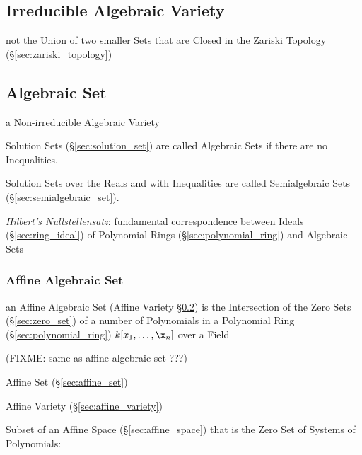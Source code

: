 \subsection{Irreducible Algebraic Variety}
\label{sec:irreducible_algebraic_variety}

not the Union of two smaller Sets that are Closed in the Zariski Topology
(\S\ref{sec:zariski_topology})



\subsection{Algebraic Set}\label{sec:algebraic_set}

a Non-irreducible Algebraic Variety

Solution Sets (\S\ref{sec:solution_set}) are called Algebraic Sets if there are
no Inequalities.

Solution Sets over the Reals and with Inequalities are called Semialgebraic
Sets (\S\ref{sec:semialgebraic_set}).

\emph{Hilbert's Nullstellensatz}: fundamental correspondence between Ideals
(\S\ref{sec:ring_ideal}) of Polynomial Rings (\S\ref{sec:polynomial_ring}) and
Algebraic Sets



\subsubsection{Affine Algebraic Set}\label{sec:affine_algebraic_set}

an Affine Algebraic Set (Affine Variety \S\ref{sec:algebraic_set}) is the
Intersection of the Zero Sets (\S\ref{sec:zero_set}) of a number of Polynomials
in a Polynomial Ring (\S\ref{sec:polynomial_ring}) $k[x_1,\ldots,\x_n]$ over a
Field

(FIXME: same as affine algebraic set ???)


Affine Set (\S\ref{sec:affine_set})

Affine Variety (\S\ref{sec:affine_variety})

Subset of an Affine Space (\S\ref{sec:affine_space}) that is the Zero Set of
Systems of Polynomials:


